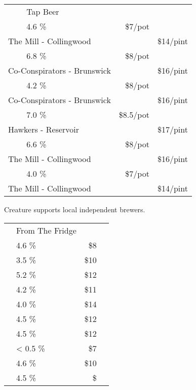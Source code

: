 \documentclass[12pt]{article}
\makeatletter
\newcommand*\ColText[1]{\textcolor{SpringGreen4}{#1}}
\newcommand*\GroupGlassTitle[2]{%
  \noalign{\vspace{2em}}
  \fontfamily{qzc}\selectfont #2 & \vspace{1em}\fontsize{20}{29}\selectfont\ColText{#1}}
\newenvironment{Group}
  {\vspace{2em}\noindent\begin{tabular*}{\textwidth}{@{} p{10mm} l@{\extracolsep{\fill}} r@{\hspace{1em}} r@{}}} %
  {\end{tabular*}}
\newcommand*\Booze[3]{%
  \noalign{\vspace{1em}}
  \multicolumn{2}{l}{ #1 \tiny\dotfill } & \scriptsize #2 \% \tiny\dotfill & \normalsize \$#3}
\newcommand*\Beer[5]{%
  \noalign{\vspace{2em}}
  \Booze{#1}{#3}{#4\tiny/pot} \\
  \multicolumn{2}{l}{ \hspace*{0.1em} \scriptsize #2 } & {} & \normalsize \$#5\tiny/pint}
\newcommand*\Glass[2]{%
    \begin{tikzpicture}[remember picture,overlay]
        \node[xshift=5mm,yshift=0mm]{%
            \texttt{[image: Glasses/\#1.png]}
        };
    \end{tikzpicture}%
}
\newcommand*\GlassWeizen{%
    \Glass{weizen}{4mm}}
\newcommand*\GlassFridge{%
    \Glass{fridge}{7.5mm}}
\makeatother
\begin{document}
%


\begin{Group}
    \GroupGlassTitle{Tap Beer}{\GlassWeizen} \\
    \Beer{Daydream \textbf{Session Ale}}{The Mill - Collingwood}{4.6}{7}{14} \\
    \Beer{The Renegade \textbf{WC IPA}}{Co-Conspirators - Brunswick}{6.8}{8}{16} \\
    \Beer{The Wheelman \textbf{Raspberry Gose}}{Co-Conspirators - Brunswick}{4.2}{8}{16} \\
    \Beer{Beneath the Trees, We Gather \textbf{Yuzu \& Plum Sour}}{Hawkers - Reservoir}{7.0}{8.5}{17} \\
    \Beer{The Dark Lord \textbf{Black IPA}}{The Mill - Collingwood}{6.6}{8}{16} \\
    \Beer{Cracking \textbf{Lager}}{The Mill - Collingwood}{4.0}{7}{14} \\
\end{Group}
\vfill
\begin{center}
	Creature supports local independent brewers.
\end{center}
\pagebreak
\begin{Group}
    \GroupGlassTitle{From The Fridge}{\GlassFridge} \\
    \Booze{Melbourne Bitter}{4.6}{8} \\
    \Booze{Bodriggy Speccy Juice \textbf{Hazy Session IPA}}{3.5}{10} \\
    \Booze{Stomping Ground \textbf{Pale Ale}}{5.2}{12} \\
    \Booze{Stomping Ground \textbf{Passionfruit Smash Sour}}{4.2}{11} \\
    \Booze{Lick Pier \textbf{Alcoholic Ginger Beer}}{4.0}{14} \\
    \Booze{Sopra Sicilian \textbf{Blood Orange Seltzer}}{4.5}{12} \\
    \Booze{Sopra Sicilian \textbf{Limoncello Seltzer}}{4.5}{12} \\
    \Booze{Hop Nation Mind Ya Head \textbf{Non Alcoholic XPA}}{< 0.5}{7} \\
    \Booze{Young Henry's \textbf{Cloudy Cider}}{4.6}{10} \\
    \Booze{Napoleone \& Co Louis \textbf{Hard Cider}}{4.5}{} \\
\end{Group}
\end{document}
